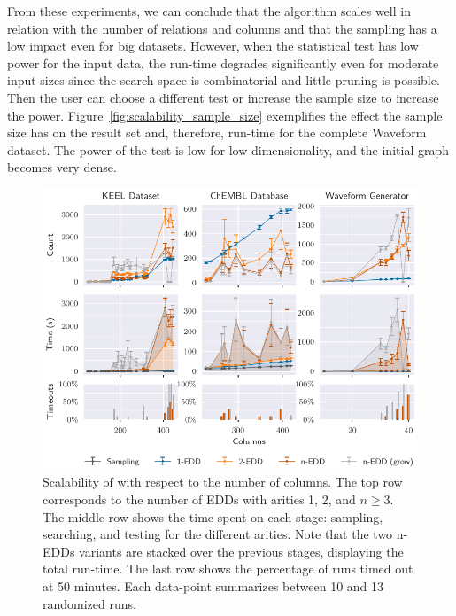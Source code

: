 From these experiments, we can conclude that the algorithm scales well in relation with the number of
relations and columns and that the sampling has a low impact even for big datasets.
However, when the statistical test has low power for the input data, the run-time degrades
significantly even for moderate input sizes since the search space is combinatorial and little
pruning is possible. Then the user can choose a different test or increase the sample size to increase the
power. Figure~\ref{fig:scalability_sample_size} exemplifies the effect the sample size has on the result
set and, therefore, run-time for the complete Waveform dataset. The power of the test is low for low
dimensionality, and the initial graph becomes very dense.

\begin{figure}[htb]
    \centering
    \includegraphics{images/presq/scalability}
    \caption{Scalability of \PresQ with respect to the number of columns.
    The top row corresponds to the number of EDDs with arities 1, 2, and $n \ge 3$.
    The middle row shows the time spent on each stage: sampling, searching, and testing for the different arities.
    Note that the two n-EDDs variants are stacked over the previous stages, displaying the total run-time.
    The last row shows the percentage of runs timed out at 50 minutes.
    Each data-point summarizes between 10 and 13 randomized runs.}
    \label{fig:scalability}
\end{figure}

